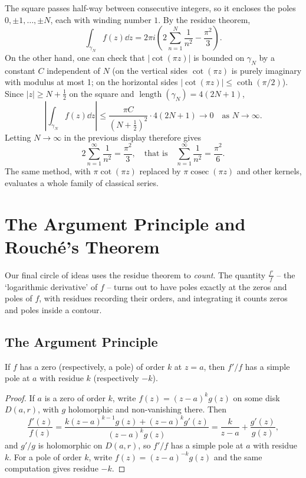 \begin{example}
    The square passes half-way between consecutive integers, so it encloses the poles $0, \pm 1, \dots, \pm N$, each with winding number $1$. By the residue theorem,
    $$
    \int_{\gamma_N} f(z) \dd z = 2 \pi i \left(2\sum_{n = 1}^{N} \frac{1}{n^2} - \frac{\pi^2}{3}\right).
    $$
    On the other hand, one can check that $|\cot(\pi z)|$ is bounded on $\gamma_N$ by a constant $C$ independent of $N$ (on the vertical sides $\cot(\pi z)$ is purely imaginary with modulus at most 1; on the horizontal sides $|\cot(\pi z)| \leq \coth(\pi/2)$). Since $|z| \geq N + \frac{1}{2}$ on the square and $\operatorname{length}(\gamma_N) = 4(2N + 1)$,
    $$
    \left|\int_{\gamma_N} f(z) \dd z \right| \leq \frac{\pi C}{(N + \frac{1}{2})^2}\cdot 4(2N + 1) \rightarrow 0 \quad \text{as } N \rightarrow \infty.
    $$
    Letting $N \rightarrow \infty$ in the previous display therefore gives
    $$
    2 \sum_{n = 1}^{\infty} \frac{1}{n^2} = \frac{\pi^2}{3}, \quad \text{that is} \quad \sum_{n = 1}^{\infty}\frac{1}{n^2} = \frac{\pi^2}{6}.
    $$
    The same method, with $\pi \cot (\pi z)$ replaced by $\pi \operatorname{cosec}(\pi z)$ and other kernels, evaluates a whole family of classical series.
\end{example}

\section{The Argument Principle and Rouch\'e's Theorem}

Our final circle of ideas uses the residue theorem to \emph{count}. The quantity $\frac{f'}{f}$ -- the `logarithmic derivative' of $f$ -- turns out to have poles exactly at the zeros and poles of $f$, with residues recording their orders, and integrating it counts zeros and poles inside a contour.

\subsection{The Argument Principle}

\begin{proposition}
    If $f$ has a zero (respectively, a pole) of order $k$ at $z = a$, then $f'/f$ has a simple pole at $a$ with residue $k$ (respectively $-k$).
\end{proposition}
\begin{proof}
    If $a$ is a zero of order $k$, write $f(z) = (z - a)^k g(z)$ on some disk $D(a, r)$, with $g$ holomorphic and non-vanishing there. Then
    $$
    \frac{f'(z)}{f(z)} = \frac{k(z - a)^{k - 1}g(z) + (z - a)^k g'(z)}{(z - a)^k g(z)} = \frac{k}{z - a} + \frac{g'(z)}{g(z)},
    $$
    and $g'/g$ is holomorphic on $D(a, r)$, so $f'/f$ has a simple pole at $a$ with residue $k$. For a pole of order $k$, write $f(z) = (z - a)^{-k}g(z)$ and the same computation gives residue $-k$.
\end{proof}

